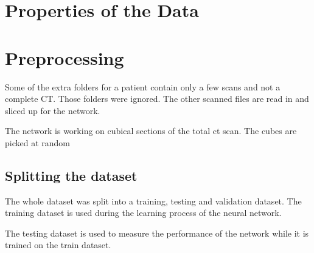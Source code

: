 \documentclass[../Thesis.tex]{subfiles}
\begin{document}
\section{Properties of the Data}

\section{Preprocessing}
Some of the extra folders for a patient contain only a few scans and not a complete CT. Those folders were ignored. The other scanned files are read in and sliced up for the network.

The network is working on cubical sections of the total ct scan. The cubes are picked at random
\subsection{Splitting the dataset}
The whole dataset was split into a training, testing and validation dataset. The training dataset is used during the learning process of the neural network.

The testing dataset is used to measure the performance of the network while it is trained on the train dataset.
\end{document}

